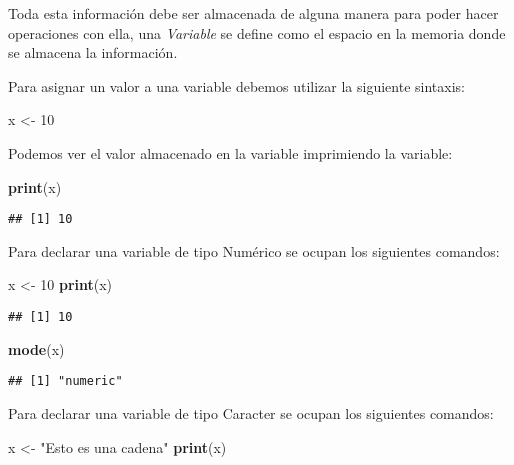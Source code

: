 \documentclass[11pt,]{article}
\newenvironment{Shaded}{\begin{snugshade}}{\end{snugshade}}
\newcommand{\DecValTok}[1]{\textcolor[rgb]{0.00,0.00,0.81}{#1}}
\newcommand{\KeywordTok}[1]{\textcolor[rgb]{0.13,0.29,0.53}{\textbf{#1}}}
\newcommand{\NormalTok}[1]{#1}
\newcommand{\StringTok}[1]{\textcolor[rgb]{0.31,0.60,0.02}{#1}}
\begin{document}
Toda esta información debe ser almacenada de alguna manera para poder
hacer operaciones con ella, una \emph{Variable} se define como el
espacio en la memoria donde se almacena la información.

Para asignar un valor a una variable debemos utilizar la siguiente
sintaxis:

\begin{Shaded}
\begin{Highlighting}[]
\NormalTok{x <-}\StringTok{ }\DecValTok{10}
\end{Highlighting}
\end{Shaded}

Podemos ver el valor almacenado en la variable imprimiendo la variable:

\begin{Shaded}
\begin{Highlighting}[]
\KeywordTok{print}\NormalTok{(x)}
\end{Highlighting}
\end{Shaded}

\begin{verbatim}
## [1] 10
\end{verbatim}

Para declarar una variable de tipo Numérico se ocupan los siguientes
comandos:

\begin{Shaded}
\begin{Highlighting}[]
\NormalTok{x <-}\StringTok{ }\DecValTok{10}
\KeywordTok{print}\NormalTok{(x)}
\end{Highlighting}
\end{Shaded}

\begin{verbatim}
## [1] 10
\end{verbatim}

\begin{Shaded}
\begin{Highlighting}[]
\KeywordTok{mode}\NormalTok{(x)}
\end{Highlighting}
\end{Shaded}

\begin{verbatim}
## [1] "numeric"
\end{verbatim}

Para declarar una variable de tipo Caracter se ocupan los siguientes
comandos:

\begin{Shaded}
\begin{Highlighting}[]
\NormalTok{x <-}\StringTok{ "Esto es una cadena"}
\KeywordTok{print}\NormalTok{(x)}
\end{Highlighting}
\end{Shaded}
\end{document}

